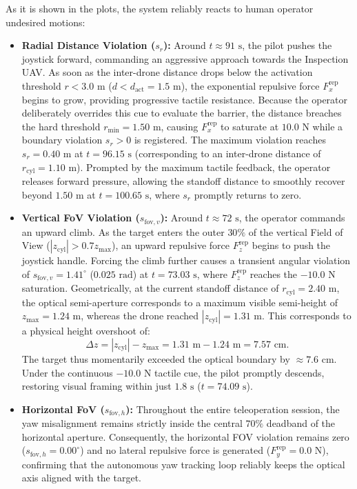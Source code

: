 \justify
As it is shown in the plots, the system reliably reacts to human operator undesired motions:
\begin{itemize}
    \item \textbf{Radial Distance Violation ($s_r$):} Around $t \approx 91\text{ s}$, the pilot pushes the joystick forward, commanding an aggressive approach towards the Inspection UAV. As soon as the inter-drone distance drops below the activation threshold $r < 3.0\text{ m}$ ($d < d_{\text{act}} = 1.5\text{ m}$), the exponential repulsive force $F_x^{\text{rep}}$ begins to grow, providing progressive tactile resistance. Because the operator deliberately overrides this cue to evaluate the barrier, the distance breaches the hard threshold $r_{\min} = 1.50\text{ m}$, causing $F_x^{\text{rep}}$ to saturate at $10.0\text{ N}$ while a boundary violation $s_r > 0$ is registered. The maximum violation reaches $s_r = 0.40\text{ m}$ at $t = 96.15\text{ s}$ (corresponding to an inter-drone distance of $r_{\text{cyl}} = 1.10\text{ m}$). Prompted by the maximum tactile feedback, the operator releases forward pressure, allowing the standoff distance to smoothly recover beyond $1.50\text{ m}$ at $t = 100.65\text{ s}$, where $s_r$ promptly returns to zero.
    \item \textbf{Vertical FoV Violation ($s_{\text{fov},v}$):} Around $t \approx 72\text{ s}$, the operator commands an upward climb. As the target enters the outer $30\%$ of the vertical Field of View ($|z_{\text{cyl}}| > 0.7 z_{\max}$), an upward repulsive force $F_z^{\text{rep}}$ begins to push the joystick handle. Forcing the climb further causes a transient angular violation of $s_{\text{fov},v} = 1.41^\circ$ ($0.025\text{ rad}$) at $t = 73.03\text{ s}$, where $F_z^{\text{rep}}$ reaches the $-10.0\text{ N}$ saturation. Geometrically, at the current standoff distance of $r_{\text{cyl}} = 2.40\text{ m}$, the optical semi-aperture corresponds to a maximum visible semi-height of $z_{\max} = 1.24\text{ m}$, whereas the drone reached $|z_{\text{cyl}}| = 1.31\text{ m}$. This corresponds to a physical height overshoot of:
    \begin{equation}
        \Delta z = |z_{\text{cyl}}| - z_{\max} = 1.31\text{ m} - 1.24\text{ m} = 7.57\text{ cm}.
    \end{equation}
    The target thus momentarily exceeded the optical boundary by $\approx 7.6\text{ cm}$. Under the continuous $-10.0\text{ N}$ tactile cue, the pilot promptly descends, restoring visual framing within just $1.8\text{ s}$ ($t = 74.09\text{ s}$).
    \item \textbf{Horizontal FoV ($s_{\text{fov},h}$):} Throughout the entire teleoperation session, the yaw misalignment remains strictly inside the central $70\%$ deadband of the horizontal aperture. Consequently, the horizontal FOV violation remains zero ($s_{\text{fov},h} = 0.00^\circ$) and no lateral repulsive force is generated ($F_y^{\text{rep}} = 0.0\text{ N}$), confirming that the autonomous yaw tracking loop reliably keeps the optical axis aligned with the target.
\end{itemize}
